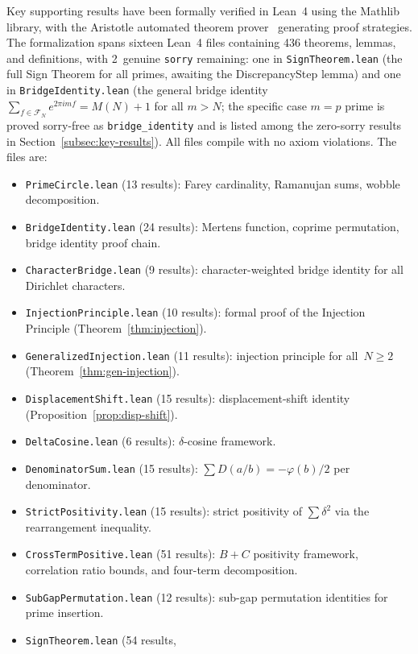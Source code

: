 \documentclass[11pt]{article}
\theoremstyle{definition}
\newcommand{\F}{\mathcal{F}}
\begin{document}
Key supporting results have been formally verified in Lean~4
using the Mathlib library, with the Aristotle automated theorem
prover~\cite{Aristotle2025} generating proof strategies.
The formalization spans sixteen Lean~4 files containing 436
theorems, lemmas, and definitions, with
2~genuine \texttt{sorry} remaining: one in \texttt{SignTheorem.lean}
(the full Sign Theorem for all primes, awaiting the DiscrepancyStep
lemma) and one in \texttt{BridgeIdentity.lean}
(the general bridge identity $\sum_{f \in \F_N} e^{2\pi imf} = M(N)+1$
for all $m > N$; the specific case $m = p$ prime is proved sorry-free
as \texttt{bridge\_identity} and is listed among the zero-sorry results
in Section~\ref{subsec:key-results}).
All files compile with no axiom
violations.  The files are:
\begin{itemize}
  \item \texttt{PrimeCircle.lean} (13 results): Farey cardinality,
    Ramanujan sums, wobble decomposition.
  \item \texttt{BridgeIdentity.lean} (24 results): Mertens function,
    coprime permutation, bridge identity proof chain.
  \item \texttt{CharacterBridge.lean} (9 results): character-weighted
    bridge identity for all Dirichlet characters.
  \item \texttt{InjectionPrinciple.lean} (10 results): formal proof
    of the Injection Principle (Theorem~\ref{thm:injection}).
  \item \texttt{GeneralizedInjection.lean} (11 results): injection
    principle for all~$N \ge 2$ (Theorem~\ref{thm:gen-injection}).
  \item \texttt{DisplacementShift.lean} (15 results):
    displacement-shift identity
    (Proposition~\ref{prop:disp-shift}).
  \item \texttt{DeltaCosine.lean} (6 results):
    $\delta$-cosine framework.
  \item \texttt{DenominatorSum.lean} (15 results):
    $\sum D(a/b) = -\varphi(b)/2$ per denominator.
  \item \texttt{StrictPositivity.lean} (15 results):
    strict positivity of $\sum \delta^2$
    via the rearrangement inequality.
  \item \texttt{CrossTermPositive.lean} (51 results):
    $B + C$ positivity framework, correlation ratio bounds,
    and four-term decomposition.
  \item \texttt{SubGapPermutation.lean} (12 results):
    sub-gap permutation identities for prime insertion.
  \item \texttt{SignTheorem.lean} (54 results,

\end{itemize}
\end{document}
